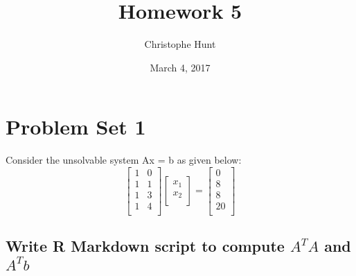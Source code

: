 \documentclass[]{article}
\title{Homework 5}
\author{Christophe Hunt}
\date{March 4, 2017}
\newenvironment{Shaded}{\begin{snugshade}}{\end{snugshade}}
\newcommand{\KeywordTok}[1]{\textcolor[rgb]{0.13,0.29,0.53}{\textbf{{#1}}}}
\newcommand{\DataTypeTok}[1]{\textcolor[rgb]{0.13,0.29,0.53}{{#1}}}
\newcommand{\DecValTok}[1]{\textcolor[rgb]{0.00,0.00,0.81}{{#1}}}
\newcommand{\StringTok}[1]{\textcolor[rgb]{0.31,0.60,0.02}{{#1}}}
\newcommand{\NormalTok}[1]{{#1}}
\begin{document}
\maketitle

{
\setcounter{tocdepth}{2}
\tableofcontents
}
\section{Problem Set 1}\label{problem-set-1}

Consider the unsolvable system Ax = b as given below: \[
\begin{bmatrix}
    1 & 0  \\
    1 & 1 \\
    1 & 3 \\
    1 & 4 \\
\end{bmatrix}
\begin{bmatrix}
x_1 \\
x_2 \\
\end{bmatrix}
=
\begin{bmatrix}
0 \\
8 \\
8 \\
20  \\
\end{bmatrix}
\]

\subsection{\texorpdfstring{Write R Markdown script to compute \(A^TA\)
and
\(A^Tb\)}{Write R Markdown script to compute A\^{}TA and A\^{}Tb}}\label{write-r-markdown-script-to-compute-ata-and-atb}

\begin{Shaded}
\end{Shaded}
\end{document}
